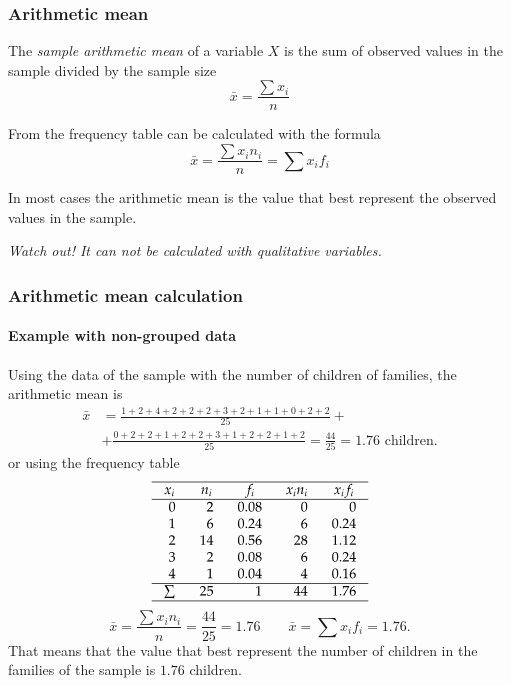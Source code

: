 \begin{frame}
\frametitle{Arithmetic mean}
\begin{definition}
The \emph{sample arithmetic mean} of a variable $X$ is the sum of observed values in the sample divided by the sample
size
\[
\bar{x} = \frac{\sum x_i}{n}
\]
\end{definition}
From the frequency table can be calculated with the formula
\[
\bar{x} = \frac{\sum x_in_i}{n} = \sum x_i f_i
\]

In most cases the arithmetic mean is the value that best represent the observed values in the sample. 
\begin{center}
\alert{\emph{Watch out! It can not be calculated with qualitative variables.}}
\end{center}
\end{frame}


\begin{frame}
\frametitle{Arithmetic mean calculation}
\framesubtitle{Example with non-grouped data}
Using the data of the sample with the number of children of families, the arithmetic mean is 
\begin{align*}
\bar{x} &= \frac{1+2+4+2+2+2+3+2+1+1+0+2+2}{25}+\\
&+\frac{0+2+2+1+2+2+3+1+2+2+1+2}{25} = \frac{44}{25} = 1.76 \mbox{ children}.
\end{align*}
or using the frequency table
\[
\setlength\arraycolsep{3mm}
\setlength\arrayrulewidth{0.5pt}
\begin{array}{rrrrr}
\hline
\multicolumn{1}{c}{x_i} & \multicolumn{1}{c}{n_i} & \multicolumn{1}{c}{f_i} & \multicolumn{1}{c}{x_in_i} & \multicolumn{1}{c}{x_if_i}\\
\hline
0 & 2 & 0.08 & 0 & 0\\
1 & 6 & 0.24 & 6 & 0.24\\
2 & 14 & 0.56 & 28 & 1.12\\
3 & 2  & 0.08 & 6 & 0.24\\
4 & 1 & 0.04 & 4 & 0.16 \\
\hline
\sum & 25 & 1 & 44 & 1.76 \\
\hline
\end{array}
\]
\[
\bar{x} = \frac{\sum x_in_i}{n} = \frac{44}{25}= 1.76 \qquad \bar{x}=\sum{x_if_i} = 1.76.
\]
That means that the value that best represent the number of children in the families of the sample is $1.76$ children.
\end{frame}


